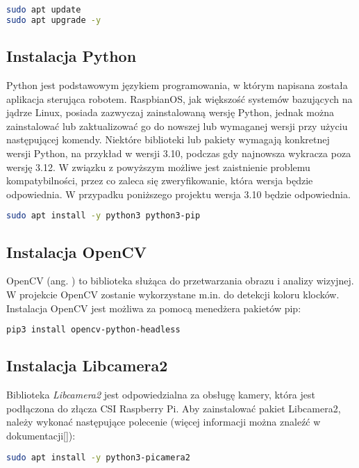 \begin{lstlisting}[language=bash]
sudo apt update
sudo apt upgrade -y
\end{lstlisting}

\subsection{Instalacja Python}
Python jest podstawowym językiem programowania, w którym napisana została aplikacja sterująca robotem. RaspbianOS, jak większość systemów bazujących na jądrze Linux, posiada zazwyczaj zainstalowaną wersję Python, jednak można zainstalować lub zaktualizować go do nowszej lub wymaganej wersji przy użyciu następującej komendy. Niektóre biblioteki lub pakiety wymagają konkretnej wersji Python, na przykład w wersji 3.10, podczas gdy najnowsza wykracza poza wersję 3.12. W związku z powyższym możliwe jest zaistnienie problemu kompatybilności, przez co zaleca się zweryfikowanie, która wersja będzie odpowiednia. W przypadku poniższego projektu wersja 3.10 będzie odpowiednia. 

\begin{lstlisting}[language=bash]
sudo apt install -y python3 python3-pip
\end{lstlisting}

\subsection{Instalacja OpenCV}
OpenCV (ang. ) to biblioteka służąca do przetwarzania obrazu i analizy wizyjnej. W projekcie OpenCV zostanie wykorzystane m.in. do detekcji koloru klocków. Instalacja OpenCV jest możliwa za pomocą menedżera pakietów pip:

\begin{lstlisting}[language=bash]
pip3 install opencv-python-headless
\end{lstlisting}

\subsection{Instalacja Libcamera2}
Biblioteka \textit{Libcamera2} jest odpowiedzialna za obsługę kamery, która jest podłączona do złącza CSI Raspberry Pi. Aby zainstalować pakiet Libcamera2, należy wykonać następujące polecenie (więcej informacji można znaleźć w dokumentacji[\cite{bib:manualLibcamera2}]):

\begin{lstlisting}[language=bash]
    sudo apt install -y python3-picamera2
\end{lstlisting}

